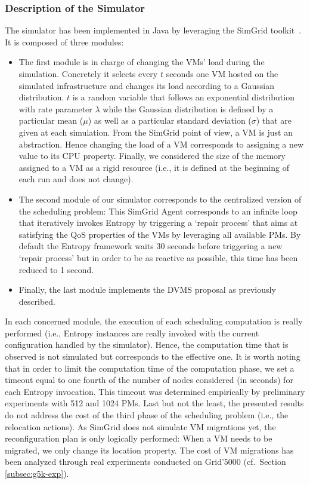 \documentclass[conference]{IEEEtran}
\begin{document}
\subsubsection{Description of the Simulator}
The simulator has been implemented in Java by leveraging the SimGrid toolkit~\cite{simgrid:uksim08}.
It is composed of three modules:

\begin{itemize}
\item The first module is in charge of changing the VMs' load during the
simulation.  Concretely it selects every $t$ seconds one VM hosted on
the simulated infrastructure and changes its load according to a
Gaussian distribution. $t$ is a random variable that follows an
exponential distribution with rate parameter $\lambda$ while the
Gaussian distribution is defined by a particular mean ($\mu$) as well
as a particular standard deviation ($\sigma$) that are given at each
simulation.  From the SimGrid point of view, a VM is just an
abstraction.  Hence changing the load of a VM corresponds to assigning
a new value to its CPU property.  Finally, we considered the size of
the memory assigned to a VM as a rigid resource (i.e., it is defined at
the beginning of each run and does not change).
\item The second module of our simulator corresponds to the centralized
version of the scheduling problem: This
SimGrid Agent corresponds to an infinite loop that iteratively invokes
Entropy by triggering a `repair process' that aims at satisfying the
QoS properties of the VMs by leveraging all available PMs.
By default the Entropy framework waits 30 seconds before triggering a new `repair
process' but in order to be as reactive as possible, this time has been
reduced to 1 second.
\item Finally, the last module implements the DVMS proposal as previously described.
\end{itemize}

In each concerned module, the execution of each scheduling computation is really performed
(i.e., Entropy instances are really invoked with the current configuration
handled by the simulator). Hence, the computation time that is observed is not
simulated but corresponds to the effective one. It is worth noting that in
order to limit the computation time of the computation phase, we
set a timeout equal to one fourth of the number of nodes
considered (in seconds) for each Entropy invocation.
This timeout was determined empirically by preliminary experiments with 512 and 1024 PMs.
Last but not the least, the presented results do not address the cost of the
third phase of the scheduling problem (i.e., the relocation actions). As SimGrid
does not simulate VM migrations yet, the reconfiguration plan is only logically
performed: When a VM needs to be migrated, we only change its location
property.  The cost of VM migrations has been analyzed through real
experiments conducted on Grid'5000 (cf.\ Section \ref{subsec:g5k-exp}).
\end{document}
